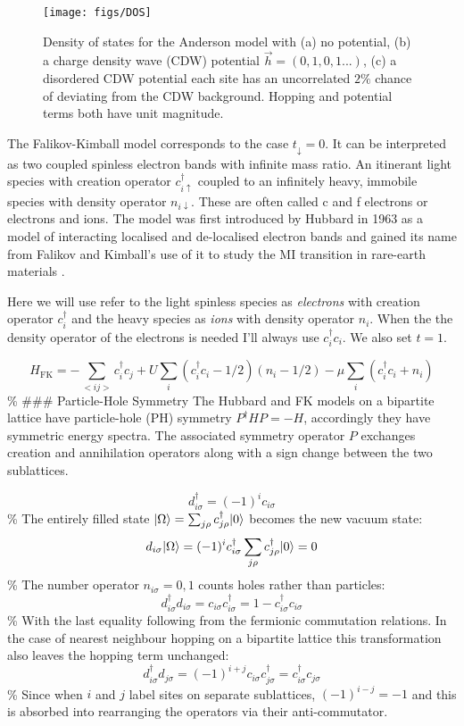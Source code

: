 \begin{figure}
  \centering
    \texttt{[image: figs/DOS]}
  \caption{Density of states for the Anderson model with (a) no potential, (b) a charge density wave (CDW) potential $\vec{h} = (0,1,0,1...)$, (c) a disordered CDW potential each site has an uncorrelated $2\%$ chance of deviating from the CDW background. Hopping and potential terms both have unit magnitude.}
  \label{fig:fk_dos}
\end{figure}

The Falikov-Kimball model corresponds to the case \(t_{\downarrow} = 0\). It can be interpreted as two coupled spinless electron bands with infinite mass ratio. An itinerant light species with creation operator \(c^\dagger_{i\uparrow}\) coupled to an infinitely heavy, immobile species with density operator \(n_{i\downarrow}\). These are often called c and f electrons or electrons and ions. The model was first introduced by Hubbard in 1963 as a model of interacting localised and de-localised electron bands and gained its name from Falikov and Kimball's use of it to study the MI transition in rare-earth materials \autocite{hubbardj.ElectronCorrelationsNarrow1963,falicov_simple_1969}.

Here we will use refer to the light spinless species as \emph{electrons} with creation operator \(c^\dagger_{i}\) and the heavy species as \emph{ions} with density operator \(n_i\). When the the density operator of the electrons is needed I'll always use \(c^\dagger_{i}c_{i}\). We also set \(t = 1\).

\[
    H_{\mathrm{FK}} = -\sum_{<ij>} c^\dagger_{i}c_{j} + U \sum_{i} (c^\dagger_{i}c_{i} - 1/2)( n_i - 1/2) - \mu \sum_i \left(c^\dagger_{i}c_{i} + n_{i}\right)
\] \% \#\#\# Particle-Hole Symmetry The Hubbard and FK models on a bipartite lattice have particle-hole (PH) symmetry \(P^\dagger H P = - H\), accordingly they have symmetric energy spectra. The associated symmetry operator \(P\) exchanges creation and annihilation operators along with a sign change between the two sublattices.

\[ d^\dagger_{i\sigma} = (-1)^i c_{i\sigma}\] \% The entirely filled state \(|\Omega\rangle = \sum_{j\rho} c^\dagger_{j\rho} |0\rangle\) becomes the new vacuum state: \[d_{i\sigma} |\Omega\rangle = (-1)^i c^\dagger_{i\sigma} \sum_{j\rho} c^\dagger_{j\rho} |0\rangle = 0\] \% The number operator \(n_{i\sigma} = 0,1\) counts holes rather than particles: \[ d^\dagger_{i\sigma} d_{i \sigma} = c_{i\sigma} c^\dagger_{i\sigma} = 1 - c^\dagger_{i\sigma} c_{i\sigma}\] \% With the last equality following from the fermionic commutation relations. In the case of nearest neighbour hopping on a bipartite lattice this transformation also leaves the hopping term unchanged: \[ d^\dagger_{i\sigma} d_{j \sigma} = (-1)^{i+j} c_{i\sigma} c^\dagger_{j\sigma} = c^\dagger_{i\sigma} c_{j\sigma} \] \% Since when \(i\) and \(j\) label sites on separate sublattices, \((-1)^{i-j} = -1\) and this is absorbed into rearranging the operators via their anti-commutator.

